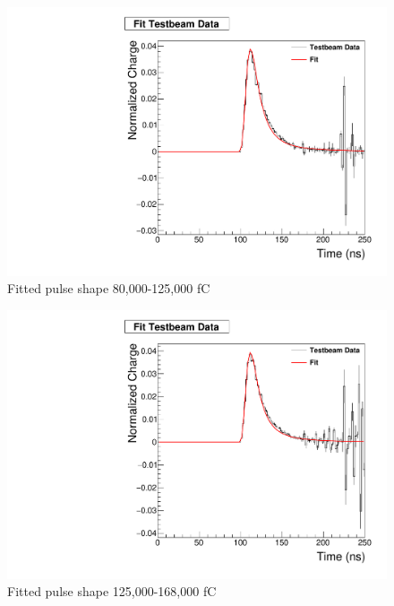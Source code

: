 \begin{figure}
\centering
\includegraphics[width=0.5\linewidth]{Figures/80FittedPlot.pdf}
\caption{Fitted pulse shape 80,000-125,000 fC}
\label{fig:80fit}
\end{figure}

\begin{figure}
\centering
\includegraphics[width=0.5\linewidth]{Figures/125FittedPlot.pdf}
\caption{Fitted pulse shape 125,000-168,000 fC}
\label{fig:125fit}
\end{figure}

